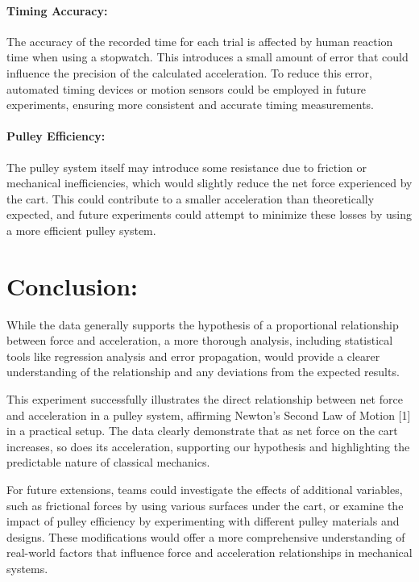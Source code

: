 \paragraph{Timing Accuracy:}

The accuracy of the recorded time for each trial is affected by human reaction time when using a stopwatch. This introduces a small amount of error that could influence the precision of the calculated acceleration. To reduce this error, automated timing devices or motion sensors could be employed in future experiments, ensuring more consistent and accurate timing measurements.

\paragraph{Pulley Efficiency:}

The pulley system itself may introduce some resistance due to friction or mechanical inefficiencies, which would slightly reduce the net force experienced by the cart. This could contribute to a smaller acceleration than theoretically expected, and future experiments could attempt to minimize these losses by using a more efficient pulley system.

\section{Conclusion:}

While the data generally supports the hypothesis of a proportional relationship between force and acceleration, a more thorough analysis, including statistical tools like regression analysis and error propagation, would provide a clearer understanding of the relationship and any deviations from the expected results.

This experiment successfully illustrates the direct relationship between net force and acceleration in a pulley system, affirming Newton's Second Law of Motion [1] in a practical setup. The data clearly demonstrate that as net force on the cart increases, so does its acceleration, supporting our hypothesis and highlighting the predictable nature of classical mechanics.

For future extensions, teams could investigate the effects of additional variables, such as frictional forces by using various surfaces under the cart, or examine the impact of pulley efficiency by experimenting with different pulley materials and designs. These modifications would offer a more comprehensive understanding of real-world factors that influence force and acceleration relationships in mechanical systems.
